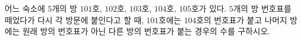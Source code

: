 어느 숙소에 $5$개의 방 $101$호, $102$호, $103$호, $104$호, $105$호가 있다. $5$개의 방 번호표를 떼었다가 다시 각 방문에 붙인다고 할 때, $101$호에는 $104$호의 번호표가 붙고 나머지 방에는 원래 방의 번호표가 아닌 다른 방의 번호표가 붙는 경우의 수를 구하시오.
